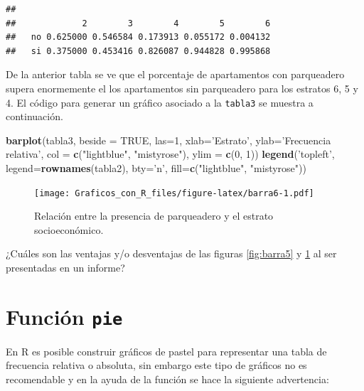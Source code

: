 \documentclass[10pt,]{krantz}
\makeatletter
\newenvironment{Shaded}{\begin{snugshade}}{\end{snugshade}}
\newcommand{\KeywordTok}[1]{\textcolor[rgb]{0.13,0.29,0.53}{\textbf{#1}}}
\newcommand{\DataTypeTok}[1]{\textcolor[rgb]{0.13,0.29,0.53}{#1}}
\newcommand{\DecValTok}[1]{\textcolor[rgb]{0.00,0.00,0.81}{#1}}
\newcommand{\StringTok}[1]{\textcolor[rgb]{0.31,0.60,0.02}{#1}}
\newcommand{\OtherTok}[1]{\textcolor[rgb]{0.56,0.35,0.01}{#1}}
\newcommand{\NormalTok}[1]{#1}
\let\proglang=\textsf
\newenvironment{kframe}{%
\medskip{}
\setlength{\fboxsep}{.8em}
 \def\at@end@of@kframe{}%
 \ifinner\ifhmode%
  \def\at@end@of@kframe{\end{minipage}}%
  \begin{minipage}{\columnwidth}%
 \fi\fi%
 \def\FrameCommand##1{\hskip\@totalleftmargin \hskip-\fboxsep
 \colorbox{shadecolor}{##1}\hskip-\fboxsep
     \hskip-\linewidth \hskip-\@totalleftmargin \hskip\columnwidth}%
 \MakeFramed {\advance\hsize-\width
   \@totalleftmargin\z@ \linewidth\hsize
   \@setminipage}}%
 {\par\unskip\endMakeFramed%
 \at@end@of@kframe}
\renewenvironment{Shaded}{\begin{kframe}}{\end{kframe}}
\makeatother
\begin{document}
\begin{verbatim}
##     
##             2        3        4        5        6
##   no 0.625000 0.546584 0.173913 0.055172 0.004132
##   si 0.375000 0.453416 0.826087 0.944828 0.995868
\end{verbatim}

De la anterior tabla se ve que el porcentaje de apartamentos con
parqueadero supera enormemente el los apartamentos sin parqueadero para
los estratos 6, 5 y 4. El código para generar un gráfico asociado a la
\texttt{tabla3} se muestra a continuación.

\begin{Shaded}
\begin{Highlighting}[]
\KeywordTok{barplot}\NormalTok{(tabla3, }
        \DataTypeTok{beside =} \OtherTok{TRUE}\NormalTok{, }\DataTypeTok{las=}\DecValTok{1}\NormalTok{, }
        \DataTypeTok{xlab=}\StringTok{'Estrato'}\NormalTok{, }\DataTypeTok{ylab=}\StringTok{'Frecuencia relativa'}\NormalTok{,}
        \DataTypeTok{col =} \KeywordTok{c}\NormalTok{(}\StringTok{"lightblue"}\NormalTok{, }\StringTok{"mistyrose"}\NormalTok{),}
        \DataTypeTok{ylim =} \KeywordTok{c}\NormalTok{(}\DecValTok{0}\NormalTok{, }\DecValTok{1}\NormalTok{))}
\KeywordTok{legend}\NormalTok{(}\StringTok{'topleft'}\NormalTok{, }\DataTypeTok{legend=}\KeywordTok{rownames}\NormalTok{(tabla2), }\DataTypeTok{bty=}\StringTok{'n'}\NormalTok{,}
       \DataTypeTok{fill=}\KeywordTok{c}\NormalTok{(}\StringTok{"lightblue"}\NormalTok{, }\StringTok{"mistyrose"}\NormalTok{))}
\end{Highlighting}
\end{Shaded}

\begin{figure}
\centering
\texttt{[image: Graficos\_con\_R\_files/figure-latex/barra6-1.pdf]}
\caption{\label{fig:barra6}Relación entre la presencia de parqueadero y el
estrato socioeconómico.}
\end{figure}

¿Cuáles son las ventajas y/o desventajas de las figuras \ref{fig:barra5}
y \ref{fig:barra6} al ser presentadas en un informe?

\section{\texorpdfstring{Función \texttt{pie} 
}{Función pie  }}\label{funcion-pie}

En \proglang{R} es posible construir gráficos de pastel para representar
una tabla de frecuencia relativa o absoluta, sin embargo este tipo de
gráficos no es recomendable y en la ayuda de la función se hace la
siguiente advertencia:
\end{document}
